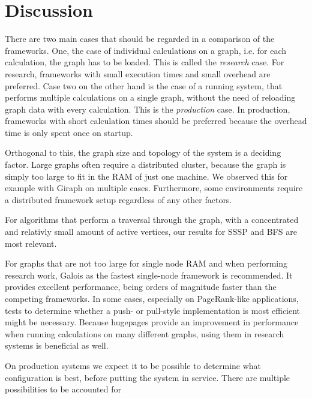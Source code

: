 
\section{Discussion}

There are two main cases that should be regarded in a comparison of the frameworks. One, the case of individual calculations on a graph, i.e. for each calculation, the graph has to be loaded. This is called the \emph{research} case. For research, frameworks with small execution times and small overhead are preferred. Case two on the other hand is the case of a running system, that performs multiple calculations on a single graph, without the need of reloading graph data with every calculation. This is the \emph{production} case.
In production, frameworks with short calculation times should be preferred because the overhead time is only spent once on startup.

Orthogonal to this, the graph size and topology of the system is a deciding factor. Large graphs often require a distributed cluster, because the graph is simply too large to fit in the RAM of just one machine. We observed this for example with Giraph on multiple cases.
Furthermore, some environments require a distributed framework setup regardless of any other factors.


For algorithms that perform a traversal through the graph, with a concentrated and relativly small amount of active vertices, our results for SSSP and BFS are most relevant.






For graphs that are not too large for single node RAM and when performing research work, Galois as the fastest single-node framework is recommended.
It provides excellent performance, being orders of magnitude faster than the competing frameworks.
In some cases, especially on PageRank-like applications, tests to determine whether a push- or pull-style implementation is most efficient might be necessary.
Because hugepages provide an improvement in performance when running calculations on many different graphs, using them in research systems is beneficial as well.




On production systems we expect it to be possible to determine what configuration is best, before putting the system in service.
There are multiple possibilities to be accounted for

